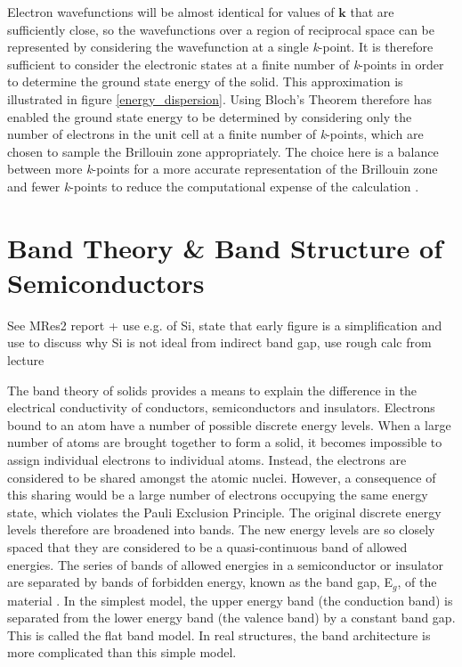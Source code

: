 Electron wavefunctions will be almost identical for values of $\mathbf{k}$ that are sufficiently close, so the wavefunctions over a region of reciprocal space can be represented by considering the wavefunction at a single \textit{k}-point. It is therefore sufficient to consider the electronic states at a finite number of \textit{k}-points in order to determine the ground state energy of the solid. This approximation is illustrated in figure \ref{energy_dispersion}. Using Bloch's Theorem therefore has enabled the ground state energy to be determined by considering only the number of electrons in the unit cell at a finite number of \textit{k}-points, which are chosen to sample the Brillouin zone appropriately. The choice here is a balance between more \textit{k}-points for a more accurate representation of the Brillouin zone and fewer \textit{k}-points to reduce the computational expense of the calculation \cite{bloch-thesis}.








\section{Band Theory \& Band Structure of Semiconductors}\label{band_theory}
See MRes2 report + use e.g. of Si, state that early figure is a simplification and use to discuss why Si is not ideal from indirect band gap, use rough calc from lecture



The band theory of solids provides a means to explain the difference in the electrical conductivity of conductors, semiconductors and insulators. Electrons bound to an atom have a number of possible discrete energy levels. When a large number of atoms are brought together to form a solid, it becomes impossible to assign individual electrons to individual atoms. Instead, the electrons are considered to be shared amongst the atomic nuclei. However, a consequence of this sharing would be a large number of electrons occupying the same energy state, which violates the Pauli Exclusion Principle. The original discrete energy levels therefore are broadened into bands. The new energy levels are so closely spaced that they are considered to be a quasi-continuous band of allowed energies. The series of bands of allowed energies in a semiconductor or insulator are separated by bands of forbidden energy, known as the band gap, E$_g$, of the material \cite{dielectric1}. In the simplest model, the upper energy band (the conduction band) is separated from the lower energy band (the valence band) by a constant band gap. This is called the flat band model. In real structures, the band architecture is more complicated than this simple model\cite{Tilley}.\\


